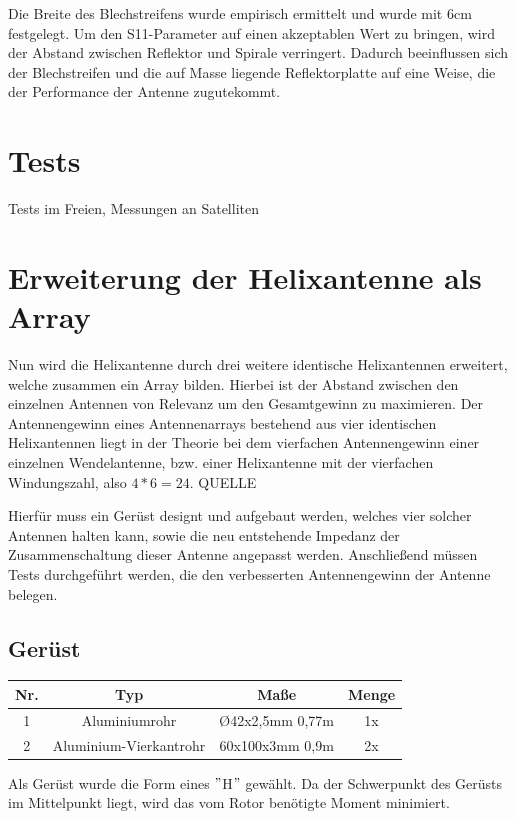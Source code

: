 Die Breite des Blechstreifens wurde empirisch ermittelt und wurde mit 6cm festgelegt. Um den S11-Parameter auf einen akzeptablen Wert zu bringen, wird der Abstand zwischen Reflektor und Spirale verringert. Dadurch beeinflussen sich der Blechstreifen und die auf Masse liegende Reflektorplatte auf eine Weise, die der Performance der Antenne zugutekommt.

\section{Tests}
Tests im Freien, Messungen an Satelliten

\section{Erweiterung der Helixantenne als Array}
Nun wird die Helixantenne durch drei weitere identische Helixantennen erweitert, welche zusammen ein Array bilden. Hierbei ist der Abstand zwischen den einzelnen Antennen von Relevanz um den Gesamtgewinn zu maximieren.
Der Antennengewinn eines Antennenarrays bestehend aus vier identischen Helixantennen liegt in der Theorie bei dem vierfachen Antennengewinn einer einzelnen Wendelantenne, bzw. einer Helixantenne mit der vierfachen Windungszahl, also $4*6=24$. QUELLE

Hierfür muss ein Gerüst designt und aufgebaut werden, welches vier solcher Antennen halten kann, sowie die neu entstehende Impedanz der Zusammenschaltung dieser Antenne angepasst werden. Anschließend müssen Tests durchgeführt werden, die den verbesserten Antennengewinn der Antenne belegen.

\subsection{Gerüst}
\label{subsec:helix_geruest}
\begin{tabular}{|c|c|c|c|}
	\hline
	Nr. & Typ & Maße & Menge \\
	\hline
	1 & Aluminiumrohr & \O42x2,5mm 0,77m & 1x \\
	\hline
	2 & Aluminium-Vierkantrohr & 60x100x3mm 0,9m & 2x \\
	\hline
\end{tabular}

Als Gerüst wurde die Form eines $"$H$"$ gewählt. Da der Schwerpunkt des Gerüsts im Mittelpunkt liegt, wird das vom Rotor benötigte Moment minimiert. 

